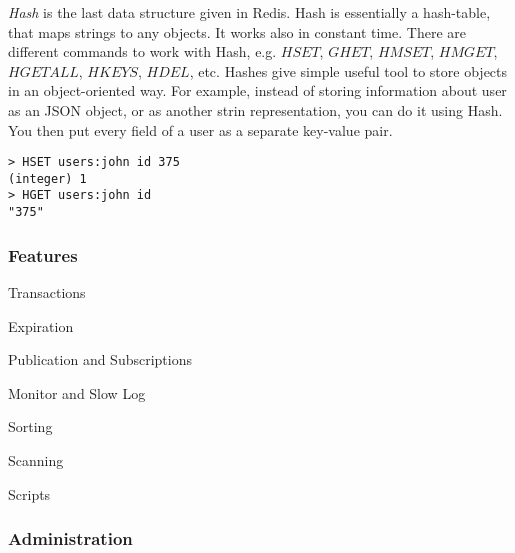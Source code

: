 \textit{Hash} is the last data structure given in Redis.
Hash is essentially a hash-table, that maps strings to any objects.
It works also in constant time.
There are different commands to work with Hash, e.g. $HSET$, $GHET$, $HMSET$, $HMGET$, $HGETALL$, $HKEYS$, $HDEL$, etc.
Hashes give simple useful tool to store objects in an object-oriented way.
For example, instead of storing information about user as an JSON object, or as another strin representation, you can do it using Hash.
You then put every field of a user as a separate key-value pair.
\begin{verbatim}
> HSET users:john id 375
(integer) 1
> HGET users:john id
"375"
\end{verbatim}

\subsubsection{Features}

Transactions

Expiration

Publication and Subscriptions

Monitor and Slow Log

Sorting

Scanning

Scripts

\subsubsection{Administration}

